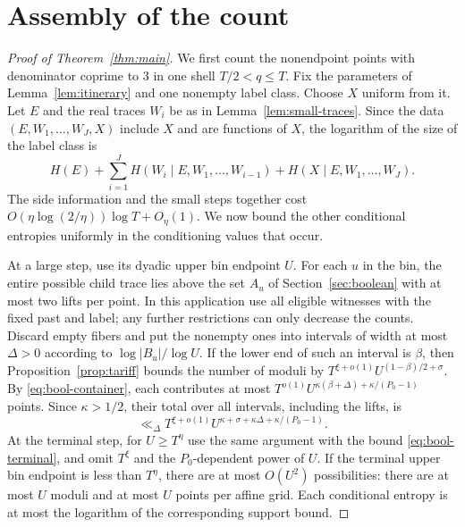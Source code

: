 \section{Assembly of the count}\label{sec:assembly}

\begin{proof}[Proof of Theorem~\ref{thm:main}]
We first count the nonendpoint points with denominator coprime to \(3\)
in one shell \(T/2<q\le T\). Fix the parameters of
Lemma~\ref{lem:itinerary} and one nonempty label class. Choose \(X\)
uniform from it. Let \(E\) and the real traces \(W_i\) be as in
Lemma~\ref{lem:small-traces}. Since the data \((E,W_1,\ldots,W_J,X)\)
include \(X\) and are functions of \(X\), the logarithm of the size of the
label class is
\[
 H(E)+\sum_{i=1}^J H(W_i\mid E,W_1,\ldots,W_{i-1})
       +H(X\mid E,W_1,\ldots,W_J).
\]
The side information and the small steps together cost
\(O(\eta\log(2/\eta))\log T+O_\eta(1)\). We now bound the other
conditional entropies uniformly in the conditioning values that occur.

At a large step, use its dyadic upper bin endpoint \(U\). For each
\(u\) in the bin, the entire possible child trace lies above the set
\(A_u\) of Section~\ref{sec:boolean} with at most two lifts per point.
In this application use all eligible witnesses with the fixed past
and label; any further restrictions can only decrease the counts.
Discard empty fibers and put the nonempty ones into intervals of
width at most \(\Delta>0\) according to
\(\log |B_u|/\log U\). If the lower end of such an interval is \(\beta\),
then Proposition~\ref{prop:tariff} bounds the number of moduli by
\(T^{\xi+o(1)}U^{(1-\beta)/2+\sigma}\). By
\eqref{eq:bool-container}, each contributes at most
\(T^{o(1)}U^{\kappa(\beta+\Delta)+\kappa/(P_0-1)}\) points. Since
\(\kappa>1/2\), their total over all intervals, including the lifts, is
\[
 \ll_{\Delta} T^{\xi+o(1)}
      U^{\kappa+\sigma+\kappa\Delta+\kappa/(P_0-1)} .
\]
At the terminal step, for \(U\ge T^\eta\) use the same argument with
the bound \eqref{eq:bool-terminal}, and omit \(T^\xi\) and the
\(P_0\)-dependent power of \(U\). If the terminal upper bin endpoint
is less than \(T^\eta\), there are at most \(O(U^2)\) possibilities:
there are at most \(U\) moduli and at most \(U\) points per affine
grid. Each conditional entropy is at most the logarithm of the
corresponding support bound.


\end{proof}

